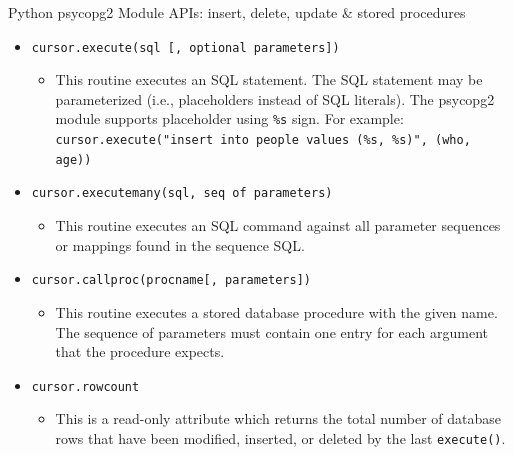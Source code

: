\documentclass[aspectratio=169, xcolor=dvipsnames]{beamer}
\begin{document}
\begin{frame}{Python psycopg2 Module APIs: insert, delete, update \& stored procedures}
    \begin{itemize}
        \item \texttt{cursor.execute(sql [, optional parameters])}
        \begin{itemize}
            \item This routine executes an SQL statement. The SQL statement may be parameterized (i.e., placeholders instead of SQL literals). The psycopg2 module supports placeholder using \texttt{\%s} sign. For example: \texttt{cursor.execute("insert into people values (\%s, \%s)", (who, age))}
        \end{itemize}
        \item \texttt{cursor.executemany(sql, seq of parameters)}
        \begin{itemize}
            \item This routine executes an SQL command against all parameter sequences or mappings found in the sequence SQL.
        \end{itemize}
        \item \texttt{cursor.callproc(procname[, parameters])}
        \begin{itemize}
            \item This routine executes a stored database procedure with the given name. The sequence of parameters must contain one entry for each argument that the procedure expects.
        \end{itemize}
        \item \texttt{cursor.rowcount}
        \begin{itemize}
            \item This is a read-only attribute which returns the total number of database rows that have been modified, inserted, or deleted by the last \texttt{execute()}.
        \end{itemize}
    \end{itemize}
\end{frame}
\end{document}
